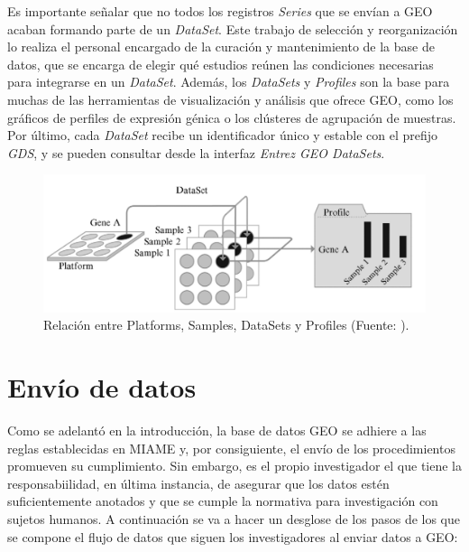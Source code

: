 Es importante señalar que no todos los registros \textit{Series} que se envían a GEO acaban formando parte de un \textit{DataSet}. Este trabajo de selección y reorganización 
lo realiza el personal encargado de la curación y mantenimiento de la base de datos, que se encarga de elegir qué estudios reúnen las condiciones necesarias para integrarse 
en un \textit{DataSet}. Además, los \textit{DataSets} y \textit{Profiles} son la base para muchas de las herramientas de visualización y análisis que ofrece GEO, como los 
gráficos de perfiles de expresión génica o los clústeres de agrupación de muestras. Por último, cada \textit{DataSet} recibe un identificador único y estable con el prefijo 
\textit{GDS}, y se pueden consultar desde la interfaz \textit{Entrez GEO DataSets}.

\begin{figure}[h]
    \centering
    \includegraphics[width=1\textwidth]{../img/geo-datasets.png}
    \caption{Relación entre Platforms, Samples, DataSets y Profiles (Fuente: \cite{geo-4}).}  %
\end{figure}


\section{Envío de datos}


Como se adelantó en la introducción, la base de datos GEO se adhiere a las reglas establecidas en MIAME y, por consiguiente, el envío de los procedimientos promueven
su cumplimiento. Sin embargo, es el propio investigador el que tiene la responsabiilidad, en última instancia, de asegurar que los datos estén suficientemente anotados y
que se cumple la normativa para investigación con sujetos humanos. A continuación se va a hacer un desglose de los pasos de los que se compone el flujo de datos que siguen 
los investigadores al enviar datos a GEO:


